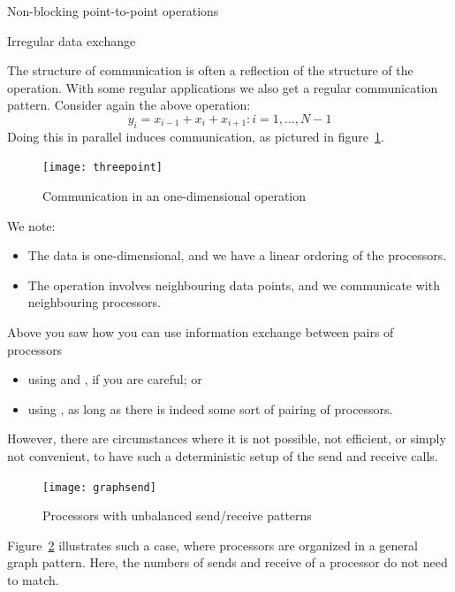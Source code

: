 
 {Non-blocking point-to-point operations}

 {Irregular data exchange}

The structure of communication is often a reflection of the structure
of the operation.
With some regular applications we also get a regular communication pattern.
Consider again the above operation:
\[ y_i=x_{i-1}+x_i+x_{i+1}\colon i=1,\ldots,N-1 \]
Doing this in parallel induces communication, as pictured in figure~\ref{fig:3pt}.
%
\begin{figure}[ht]
  \texttt{[image: threepoint]}
  \caption{Communication in an one-dimensional operation}
  \label{fig:3pt}
\end{figure}
%
We note:
\begin{itemize}
\item The data is one-dimensional, and we have a linear ordering of the processors.
\item The operation involves neighbouring data points, and we communicate
  with neighbouring processors.
\end{itemize}

Above you saw how you can use information exchange between pairs of processors
\begin{itemize}
\item using  and , if you are careful; or
\item using , as long as there is indeed some sort of pairing of processors.
\end{itemize}
However, there are circumstances where it is not possible, not efficient, or simply not
convenient, to have such a deterministic setup of the send and receive calls.
%
\begin{figure}
  \texttt{[image: graphsend]}
  \caption{Processors with unbalanced send/receive patterns}
  \label{fig:graphsend}
\end{figure}
%
Figure~\ref{fig:graphsend} illustrates such a case, where processors are
organized in a general graph pattern. Here, the numbers of sends and receive
of a processor do not need to match.

